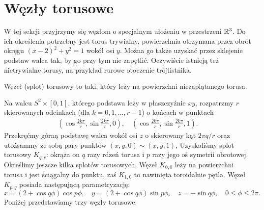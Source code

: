 \section{Węzły torusowe} %
\label{sec:torus}
W tej sekcji przyjrzymy się węzłom o specjalnym ułożeniu w przestrzeni $\mathbb R^3$.
Do ich określenia potrzebny jest torus trywialny,
powierzchnia otrzymana przez obrót okręgu $(x-2)^2 + y^2 = 1$ wokół osi $y$.
Można go także uzyskać przez sklejenie podstaw walca tak, by go przy tym nie zapętlić.
Oczywiście istnieją też nietrywialne torusy, na przykład rurowe otoczenie trójlistnika.

\begin{definition}
    Węzeł (splot) torusowy to taki, który leży na powierzchni niezaplątanego torusa. 
\end{definition}

Na walcu $S^2 \times [0,1]$, którego podstawa leży w płaszczyźnie $xy$, rozpatrzmy $r$ skierowanych odcinkach (dla $k = 0, 1, \ldots, r - 1$) o końcach w punktach
\begin{align*}
    \left(\cos \frac{2k \pi}{r}, \sin \frac{2k\pi}{r}, 0 \right), \quad
    \left(\cos \frac{2k \pi}{r}, \sin \frac{2k\pi}{r}, 1 \right).
\end{align*}
Przekręćmy górną podstawę walca wokół osi $z$ o skierowany kąt $2\pi q / r$ oraz utożsammy ze sobą pary punktów $(x, y, 0) \sim (x, y, 1)$,
Uzyskaliśmy splot torusowy $K_{q, r}$: okrąża on $q$ razy rdzeń torusa i $p$ razy jego oś symetrii obrotowej.
Określimy jeszcze kilka splotów torusowych.
Węzeł $K_{0, 0}$ leży na powierzchni torusa i jest ściągalny do punktu, zaś $K_{1, 0}$ to nawinięta toroidalnie pętla.
Węzeł $K_{p, q}$ posiada następującą parametryzację:
\[
    x = (2+\cos q \phi) \cos p \phi, \quad
    y = (2+\cos q \phi) \sin p \phi, \quad
    z = - \sin q \phi, \quad
    0 \le \phi \le 2\pi.
\]
Poniżej przedstawiamy trzy węzły torusowe.

